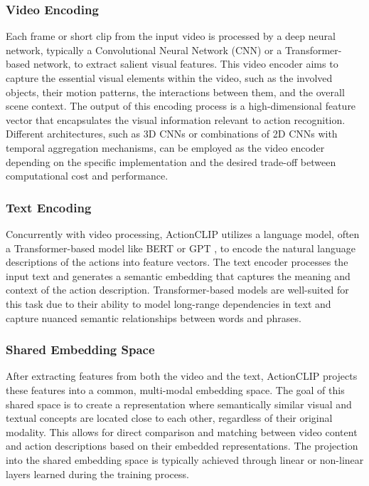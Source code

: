 \subsubsection{Video Encoding}

Each frame or short clip from the input video is processed by a deep neural network, typically a Convolutional Neural Network (CNN) or a Transformer-based network, to extract salient visual features. This video encoder aims to capture the essential visual elements within the video, such as the involved objects, their motion patterns, the interactions between them, and the overall scene context. The output of this encoding process is a high-dimensional feature vector that encapsulates the visual information relevant to action recognition. Different architectures, such as 3D CNNs or combinations of 2D CNNs with temporal aggregation mechanisms, can be employed as the video encoder depending on the specific implementation and the desired trade-off between computational cost and performance.

\subsubsection{Text Encoding}

Concurrently with video processing, ActionCLIP utilizes a language model, often a Transformer-based model like BERT \cite{devlin2018bert} or GPT \cite{radford2019language}, to encode the natural language descriptions of the actions into feature vectors. The text encoder processes the input text and generates a semantic embedding that captures the meaning and context of the action description. Transformer-based models are well-suited for this task due to their ability to model long-range dependencies in text and capture nuanced semantic relationships between words and phrases.

\subsubsection{Shared Embedding Space}

After extracting features from both the video and the text, ActionCLIP projects these features into a common, multi-modal embedding space. The goal of this shared space is to create a representation where semantically similar visual and textual concepts are located close to each other, regardless of their original modality. This allows for direct comparison and matching between video content and action descriptions based on their embedded representations. The projection into the shared embedding space is typically achieved through linear or non-linear layers learned during the training process.

